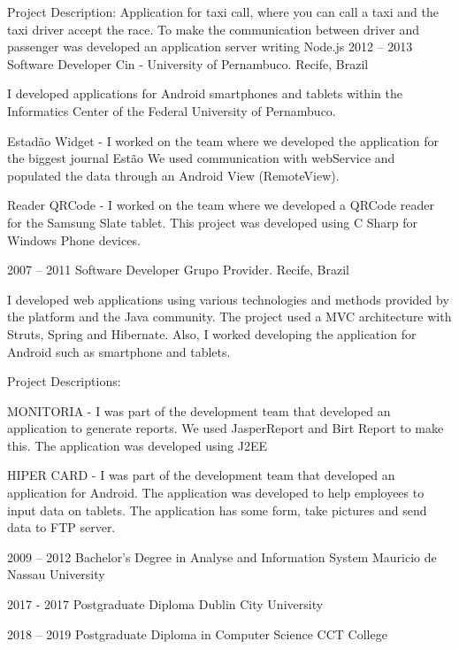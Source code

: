 \documentclass[9pt]{developercv} %
\begin{document}
\begin{entrylist}
{Project Description:
Application for taxi call, where you can call a taxi and the taxi driver accept the race. To make the communication between driver and passenger was developed an application server writing Node.js}
\entry
		{2012 -- 2013}
		{Software Developer}
		{Cin - University of Pernambuco. Recife, Brazil}
		{I developed applications for Android smartphones and tablets within the Informatics Center of the Federal University of Pernambuco.

Estadão Widget - I worked on the team where we developed the application for the biggest journal Estão We used communication with webService and populated the data through an Android View (RemoteView).

Reader QRCode - I worked on the team where we developed a QRCode reader for the Samsung Slate tablet. This project was developed using C Sharp for Windows Phone devices.}
\entry
		{2007 -- 2011}
		{Software Developer}
		{Grupo Provider. Recife, Brazil}
		{I developed web applications using various technologies and methods provided by the platform and the Java community. The project used a MVC architecture with Struts, Spring and Hibernate. Also, I worked developing the application for Android such as smartphone and tablets.

Project Descriptions:

MONITORIA - I was part of the development team that developed an application to generate reports. We used JasperReport and Birt Report to make this. The application was developed using J2EE

HIPER CARD - I was part of the development team that developed an application for Android. The application was developed to help employees to input data on tablets. The application has some form, take pictures and send data to FTP server.}
\end{entrylist}



\begin{entrylist}
	\entry
		{2009 -- 2012}
		{Bachelor's Degree in  Analyse and Information System}
		{Mauricio de Nassau University}
		
	\entry
		{2017 - 2017}
		{Postgraduate Diploma}
		{Dublin City University}
		
	\entry
		{2018 -- 2019}
		{Postgraduate Diploma in Computer Science}
		{CCT College}
		
\end{entrylist}
\end{document}

